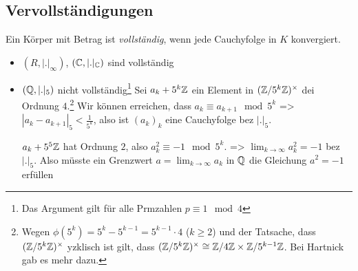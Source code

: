 \documentclass[../main.tex]{subfiles}
\begin{document}
\subsection{Vervollständigungen}
\begin{definition}
    Ein Körper mit Betrag ist \emph{vollständig}, wenn jede Cauchyfolge in $K$ konvergiert.
\end{definition}
\begin{example}
    \begin{itemize}
        \item $(R,|.|_\infty)$, $(\mathbb{C}, |.|_{\mathbb{C}})$ sind vollständig
        \item $(\mathbb{Q}, |.|_5)$ nicht vollständig\footnote{Das Argument gilt für alle Prmzahlen $p\equiv 1\mod 4$}
        Sei $a_k + 5^k\mathbb{Z}$ ein Element in $(\mathbb{Z}/5^k\mathbb{Z})^\times$ dei Ordnung $4$.\footnote{Wegen $\phi(5^k) = 5^k-5^{k-1}  = 5^{k-1} \cdot 4$ ($k\geq 2$) und der Tatsache, dass $(\mathbb{Z}/5^k\mathbb{Z})^\times$ yzklisch ist gilt, dass $(\mathbb{Z}/5^k\mathbb{Z})^\times \cong \mathbb{Z}/4\mathbb{Z} \times \mathbb{Z}/5^{k-1}\mathbb{Z}$. Bei Hartnick gab es mehr dazu.}
        Wir können erreichen, dass $a_k\equiv a_{k+1}\mod 5^k$
        => $|a_k-a_{k+1}|_5 < \frac{1}{5^k}$, also ist $(a_k)_k$ eine Cauchyfolge bez $|.|_5$.

        $a_k + 5^5\mathbb{Z}$ hat Ordnung $2$, also $a_k^2 \equiv -1 \mod 5^k$.
        => $\lim_{k\rightarrow \infty} a_k^2 = -1$ bez $|.|_5$.
        Also müsste ein Grenzwert $a=\lim_{k\rightarrow \infty} a_k$ in $\mathbb{Q}$ die Gleichung $a^2= -1$ erfüllen \Lightning
    \end{itemize}
\end{example}
\end{document}
